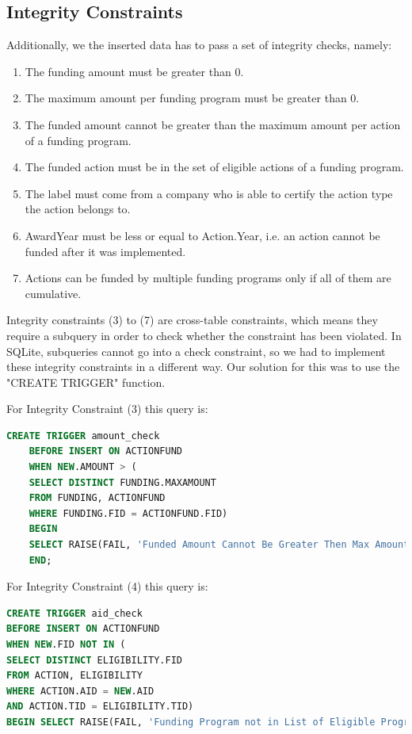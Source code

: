 \subsection{Integrity Constraints}
Additionally, we the inserted data has to pass a set of integrity checks, namely:
\begin{enumerate}
    \item The funding amount must be greater than 0.
    \item The maximum amount per funding program must be greater than 0.
    \item The funded amount cannot be greater than the maximum amount per action of a funding program.
    \item The funded action must be in the set of eligible actions of a funding program.
    \item The label must come from a company who is able to certify the action type the action belongs to.
    \item AwardYear must be less or equal to Action.Year, i.e. an action cannot be funded after it was implemented.
    \item Actions can be funded by multiple funding programs only if all of them are cumulative.
\end{enumerate}

Integrity constraints (3) to (7) are cross-table constraints, which means they require a subquery in order to check whether
the constraint has been violated.
In SQLite, subqueries cannot go into a check constraint, so we had to implement these integrity constraints in a different way.
Our solution for this was to use the "CREATE TRIGGER" function.

For Integrity Constraint (3) this query is:

\begin{lstlisting}[language=SQL]
    CREATE TRIGGER amount_check
    BEFORE INSERT ON ACTIONFUND
    WHEN NEW.AMOUNT > (
    SELECT DISTINCT FUNDING.MAXAMOUNT
    FROM FUNDING, ACTIONFUND
    WHERE FUNDING.FID = ACTIONFUND.FID)
    BEGIN
    SELECT RAISE(FAIL, 'Funded Amount Cannot Be Greater Then Max Amount');
    END;
\end{lstlisting}

For Integrity Constraint (4) this query is:

\begin{lstlisting}[language=SQL]
CREATE TRIGGER aid_check
BEFORE INSERT ON ACTIONFUND
WHEN NEW.FID NOT IN (
SELECT DISTINCT ELIGIBILITY.FID
FROM ACTION, ELIGIBILITY
WHERE ACTION.AID = NEW.AID
AND ACTION.TID = ELIGIBILITY.TID)
BEGIN SELECT RAISE(FAIL, 'Funding Program not in List of Eligible Programs for this Action Type'); END;
\end{lstlisting}

